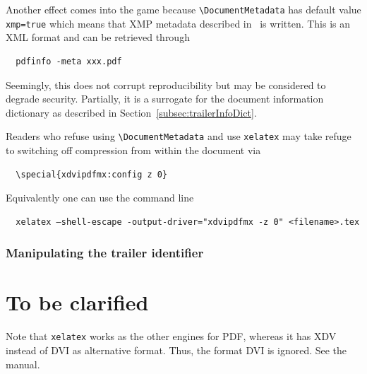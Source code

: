 \documentclass[a4paper]{article}%
\newcommand{\xelatex}{\texttt{xelatex}}
\newcommand{\cmd}[1]{\texttt{\textbackslash#1}}
\begin{document}
Another effect comes into the game because \cmd{DocumentMetadata} 
has default value \texttt{xmp=true} which means that XMP metadata 
described in~\cite{ISO16684-1:19} is written. 
This is an XML format and can be retrieved through 
%
\begin{verbatim}
  pdfinfo -meta xxx.pdf
\end{verbatim}

Seemingly, this does not corrupt reproducibility but may be considered to degrade security. 
Partially, it is a surrogate for the document information dictionary 
as described in Section~\ref{subsec:trailerInfoDict}. 

Readers who refuse using \cmd{DocumentMetadata} and  use \xelatex{} 
may take refuge to switching off compression from within the document via 
%
\begin{verbatim}
  \special{xdvipdfmx:config z 0}
\end{verbatim}

Equivalently one can use the command line 
%
\begin{verbatim}
  xelatex –shell-escape -output-driver="xdvipdfmx -z 0" <filename>.tex
\end{verbatim}

\subsubsection{Manipulating the trailer identifier}\label{subsubsec:trailerId}




\section{To be clarified}\label{sec:TBC}

Note that \xelatex{} works as the other engines for PDF, 
whereas it has XDV instead of DVI as alternative format. 
Thus, the format DVI is ignored. 
See the manual. 



{}%
\end{document}
